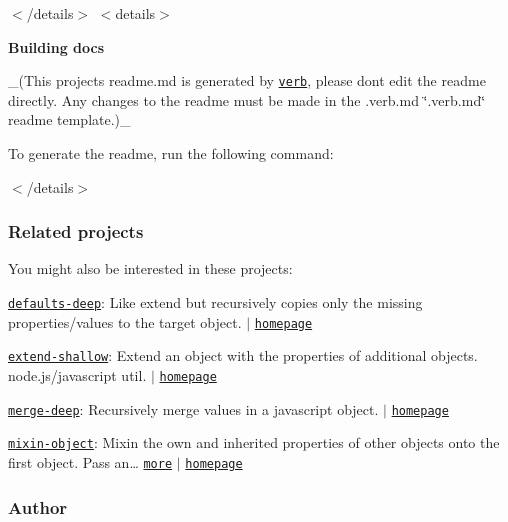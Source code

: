 $<$/details$>$ $<$details$>$ 

{\bfseries Building docs}

\+\_\+(This project\textquotesingle{}s readme.\+md is generated by \href{https://github.com/verbose/verb-generate-readme}{\tt verb}, please don\textquotesingle{}t edit the readme directly. Any changes to the readme must be made in the .verb.\+md \char`\"{}.\+verb.\+md\char`\"{} readme template.)\+\_\+

To generate the readme, run the following command\+:




$<$/details$>$

\subsubsection*{Related projects}

You might also be interested in these projects\+:


\begin{DoxyItemize}
\item \href{https://www.npmjs.com/package/defaults-deep}{\tt defaults-\/deep}\+: Like {\ttfamily extend} but recursively copies only the missing properties/values to the target object. $\vert$ \href{https://github.com/jonschlinkert/defaults-deep}{\tt homepage}
\item \href{https://www.npmjs.com/package/extend-shallow}{\tt extend-\/shallow}\+: Extend an object with the properties of additional objects. node.\+js/javascript util. $\vert$ \href{https://github.com/jonschlinkert/extend-shallow}{\tt homepage}
\item \href{https://www.npmjs.com/package/merge-deep}{\tt merge-\/deep}\+: Recursively merge values in a javascript object. $\vert$ \href{https://github.com/jonschlinkert/merge-deep}{\tt homepage}
\item \href{https://www.npmjs.com/package/mixin-object}{\tt mixin-\/object}\+: Mixin the own and inherited properties of other objects onto the first object. Pass an… \href{https://github.com/jonschlinkert/mixin-object}{\tt more} $\vert$ \href{https://github.com/jonschlinkert/mixin-object}{\tt homepage}
\end{DoxyItemize}

\subsubsection*{Author}

